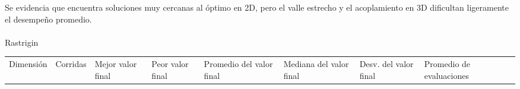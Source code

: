 \documentclass[
  12pt,
  letterpaper,
  DIV=11,
  numbers=noendperiod]{scrartcl}
\makeatletter
\let\oldparagraph\paragraph
\renewcommand{\paragraph}{
    \@ifstar
      \xxxParagraphStar
      \xxxParagraphNoStar
  }
\newcommand{\xxxParagraphStar}[1]{\oldparagraph*{#1}\mbox{}}
\newcommand{\xxxParagraphNoStar}[1]{\oldparagraph{#1}\mbox{}}
\newcounter{none} %
\makeatother
\begin{document}
Se evidencia que encuentra soluciones muy cercanas al óptimo en 2D, pero
el valle estrecho y el acoplamiento en 3D dificultan ligeramente el
desempeño promedio.

\paragraph{Rastrigin}\label{rastrigin-1}

{\def\LTcaptype{none} %
\begin{longtable}[]{@{}
  >{\raggedleft\arraybackslash}p{}
  >{\raggedleft\arraybackslash}p{}
  >{\raggedleft\arraybackslash}p{}
  >{\raggedleft\arraybackslash}p{}
  >{\raggedleft\arraybackslash}p{}
  >{\raggedleft\arraybackslash}p{}
  >{\raggedleft\arraybackslash}p{}
  >{\raggedleft\arraybackslash}p{}
  >{\raggedleft\arraybackslash}p{}@{}}
\toprule\noalign{}
\begin{minipage}[b]{\linewidth}\raggedleft
Dimensión
\end{minipage} & \begin{minipage}[b]{\linewidth}\raggedleft
Corridas
\end{minipage} & \begin{minipage}[b]{\linewidth}\raggedleft
Mejor valor final
\end{minipage} & \begin{minipage}[b]{\linewidth}\raggedleft
Peor valor final
\end{minipage} & \begin{minipage}[b]{\linewidth}\raggedleft
Promedio del valor final
\end{minipage} & \begin{minipage}[b]{\linewidth}\raggedleft
Mediana del valor final
\end{minipage} & \begin{minipage}[b]{\linewidth}\raggedleft
Desv. del valor final
\end{minipage} & \begin{minipage}[b]{\linewidth}\raggedleft
Promedio de evaluaciones
\end{minipage} & \begin{minipage}[b]{\linewidth}\raggedleft

\end{minipage}
\end{longtable}}
\end{document}

